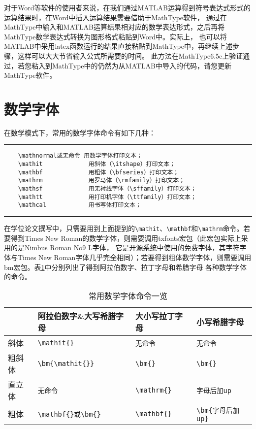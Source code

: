 对于Word等软件的使用者来说，在我们通过MATLAB运算得到符号表达式形式的运算结果时，在Word中插入运算结果需要借助于MathType软件，
通过在MathType中输入和MATLAB运算结果相对应的数学表达形式，之后再将MathType数学表达式转换为图形格式粘贴到Word中。实际上，
也可以将MATLAB中采用latex函数运行的结果直接粘贴到MathType中，再继续上述步骤，这样可以大大节省输入公式所需要的时间。
此方法在MathType6.5c上验证通过，若您粘入到MathType中的仍然为从MATLAB中导入的代码，请您更新MathType软件。

\section{数学字体}
在数学模式下，常用的数学字体命令有如下几种：

\vspace{1em}\noindent\hrule
\begin{verbatim}
	\mathnormal或无命令 用数学字体打印文本；
	\mathit             用斜体（\itshape）打印文本；
	\mathbf             用粗体（\bfseries）打印文本；
	\mathrm             用罗马体（\rmfamily）打印文本；
	\mathsf             用无衬线字体（\sffamily）打印文本；
	\mathtt             用打印机字体（\ttfamily）打印文本；
	\mathcal            用书写体打印文本；
\end{verbatim}
\noindent\hrule\vspace{1em}

在学位论文撰写中，只需要用到上面提到的\verb|\mathit|、\verb|\mathbf|和\verb|\mathrm|命令。若要得到Times New Roman的数学字体，则需要调用txfonts宏包（此宏包实际上采用的是Nimbus Roman No9 L字体，
它是开源系统中使用的免费字体，其字符字体与Times New Roman字体几乎完全相同）；若要得到粗体数学字体，则需要调用bm宏包。表\ref{tab:fonts}中分别列出了得到阿拉伯数字、拉丁字母和希腊字母
各种数学字体的命令。

\begin{table}[htbp]
	\caption{常用数学字体命令一览}\label{tab:fonts}
	\vspace{0.5em}\centering{}
	\begin{tabular}{llll}
		\toprule
		       & 阿拉伯数字\&大写希腊字母 & 大小写拉丁字母          & 小写希腊字母            \\
		\midrule
		斜体   & \verb|\mathit{}|   & \verb|无命令|  & \verb|无命令|  \\
		粗斜体 & \verb|\bm{\mathit{}}|   & \verb|\bm{}| & \verb|\bm{}| \\
		直立体 & \verb|无命令|  & \verb|\mathrm{}| & \verb|字母后加up| \\
		粗体   & \verb|\mathbf{}或\bm{}|  & \verb|\mathbf{}| & \verb|\bm{字母后加up}| \\
		\bottomrule
	\end{tabular}
	\vspace{\baselineskip}
\end{table}


